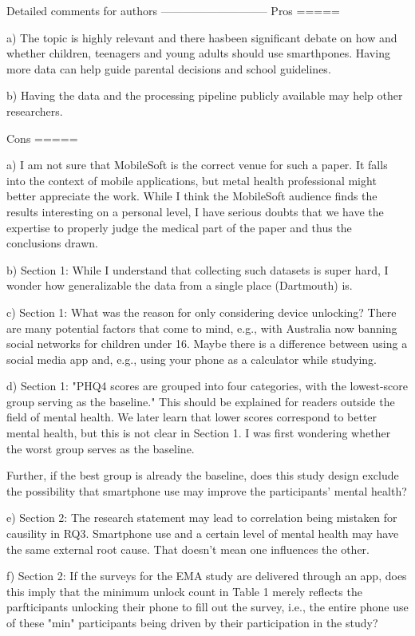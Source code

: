Detailed comments for authors
-----------------------------
Pros
=====

a) The topic is highly relevant and there hasbeen significant debate on how and whether children, teenagers and young adults should use smarthpones. Having more data can help guide parental decisions and school guidelines.

b) Having the data and the processing pipeline publicly available may help other researchers.


Cons
=====

a) I am not sure that MobileSoft is the correct venue for such a paper. It falls into the context of mobile applications, but metal health professional might better appreciate the work. While I think the MobileSoft audience finds the results interesting on a personal level, I have serious doubts that we have the expertise to properly judge the medical part of the paper and thus the conclusions drawn.

b) Section 1: While I understand that collecting such datasets is super hard, I wonder how generalizable the data from a single place (Dartmouth) is.

c) Section 1: What was the reason for only considering device unlocking? There are many potential factors that come to mind, e.g., with Australia now banning social networks for children under 16. Maybe there is a difference between using a social media app and, e.g., using your phone as a calculator while studying.

d) Section 1: "PHQ4 scores are grouped into four categories, with the lowest-score group serving as the baseline." This should be explained for readers outside the field of mental health. We later learn that lower scores correspond to better mental health, but this is not clear in Section 1. I was first wondering whether the worst group serves as the baseline.

Further, if the best group is already the baseline, does this study design exclude the possibility that smartphone use may improve the participants' mental health?

e) Section 2: The research statement may lead to correlation being mistaken for causility in RQ3. Smartphone use and a certain level of mental health may have the same external root cause. That doesn't mean one influences the other.

f) Section 2: If the surveys for the EMA study are delivered through an app, does this imply that the minimum unlock count in Table 1 merely reflects the parfticipants unlocking their phone to fill out the survey, i.e., the entire phone use of these "min" participants being driven by their participation in the study?

